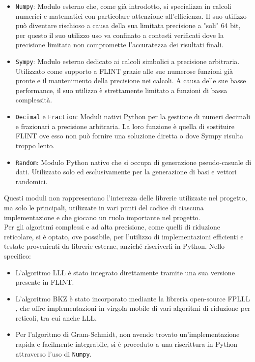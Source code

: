 \begin{itemize}
    \item \texttt{Numpy}: Modulo esterno che, come già introdotto, si specializza in calcoli
    numerici e matematici con particolare attenzione all'efficienza. Il suo utilizzo può
    diventare rischioso a causa della sua limitata precisione a "soli" 64 bit, per questo 
    il suo utilizzo uso va confinato a contesti verificati 
    dove la precisione limitata non compromette l'accuratezza dei risultati finali.
    \item \texttt{Sympy}: Modulo esterno dedicato ai calcoli simbolici a precisione arbitraria.
    Utilizzato come supporto a FLINT grazie alle sue numerose funzioni già pronte e il 
    mantenimento della precisione nei calcoli. A causa delle sue basse performance, il suo
    utilizzo è strettamente limitato a funzioni di bassa complessità.
    \item \texttt{Decimal} e \texttt{Fraction}: Moduli nativi Python per la gestione di numeri decimali e 
    frazionari a precisione arbitraria. La loro funzione è quella di sostituire FLINT ove 
    esso non può fornire una soluzione diretta o dove Sympy risulta troppo lento.
    \item \texttt{Random}: Modulo Python nativo che si occupa di generazione pseudo-casuale di dati.
    Utilizzato solo ed esclusivamente per la generazione di basi e vettori randomici. 
\end{itemize}

Questi moduli non rappresentano l'interezza delle librerie utilizzate nel progetto, ma solo
le principali, utilizzate in vari punti del codice di ciascuna implementazione e che giocano
un ruolo importante nel progetto. \\
Per gli algoritmi complessi e ad alta precisione, come quelli di riduzione reticolare, 
si è optato, ove possibile, per l'utilizzo di implementazioni efficienti e testate 
provenienti da librerie esterne, anziché riscriverli in Python. 
Nello specifico:
\begin{itemize}
    \item L'algoritmo LLL è stato integrato direttamente tramite una sua versione presente in FLINT.
    \item L'algoritmo BKZ è stato incorporato mediante la libreria open-source FPLLL \cite{FPLLL}, 
    che offre implementazioni in virgola mobile di vari algoritmi di riduzione per reticoli, tra cui
    anche LLL.
    \item Per l'algoritmo di Gram-Schmidt, non avendo trovato un'implementazione rapida 
    e facilmente integrabile, si è proceduto a una riscrittura in Python attraverso l'uso 
    di \texttt{Numpy}.
\end{itemize}

